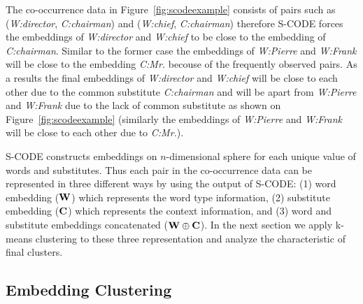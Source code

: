 
The co-occurrence data in Figure~\ref{fig:scodeexample} consists of
pairs such as (\textit{W:director}, \textit{C:chairman}) and
(\textit{W:chief}, \textit{C:chairman}) therefore S-CODE forces the
embeddings of \textit{W:director} and \textit{W:chief} to be close to
the embedding of \textit{C:chairman}.  Similar to the former case the
embeddings of \textit{W:Pierre} and \textit{W:Frank} will be close to
the embedding \textit{C:Mr.} becouse of the frequently observed pairs.
As a results the final embeddings of \textit{W:director} and
\textit{W:chief} will be close to each other due to the common
substitute \textit{C:chairman} and will be apart from
\textit{W:Pierre} and \textit{W:Frank} due to the lack of common
substitute as shown on Figure~\ref{fig:scodeexample} (similarly the
embeddings of \textit{W:Pierre} and \textit{W:Frank} will be close to
each other due to \textit{C:Mr.}).

S-CODE constructs embeddings on $n$-dimensional sphere for each unique
value of words and substitutes.  Thus each pair in the co-occurrence
data can be represented in three different ways by using the output of
S-CODE: (1) word embedding (${\bf W}$) which represents the word type
information, (2) substitute embedding (${\bf C}$) which represents the
context information, and (3) word and substitute embeddings
concatenated (${\bf W}\oplus{\bf C}$).  In the next section we apply
k-means clustering to these three representation and analyze the
characteristic of final clusters.

\subsection{Embedding Clustering}
\label{sec:clustering}

